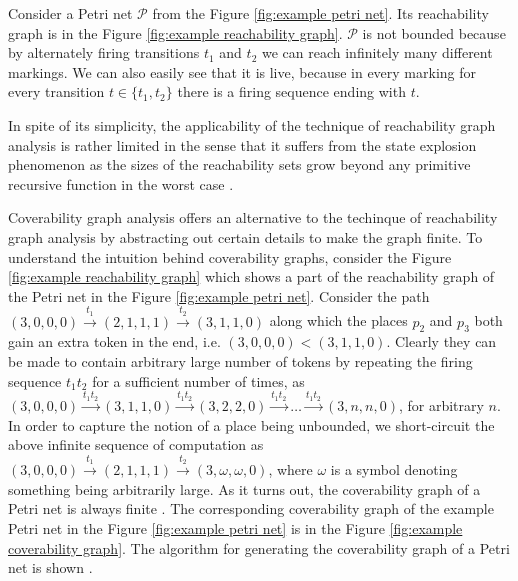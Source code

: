 \begin{example}
  Consider a Petri net $\mathcal P$ from the Figure \ref{fig:example petri net}. Its reachability graph is in the Figure \ref{fig:example reachability graph}. $\mathcal P$ is not bounded because by alternately firing transitions $t_1$ and $t_2$ we can reach infinitely many different markings. We can also easily see that it is live, because in every marking for every transition $t\in\{t_1, t_2\}$ there is a firing sequence ending with $t$.
\end{example}

In spite of its simplicity, the applicability of the technique of reachability graph analysis is rather limited in the sense that it suffers from the state explosion phenomenon as the sizes of the reachability sets grow beyond any primitive recursive function in the worst case \cite{Yen06PetriNets}.

 Coverability graph analysis offers an alternative to the techinque of reachability graph analysis by abstracting out certain details to make the graph finite. To understand the intuition behind coverability graphs, consider the Figure \ref{fig:example reachability graph} which shows a part of the reachability graph of the Petri net in the Figure \ref{fig:example petri net}. Consider the path $(3,0,0,0)\xrightarrow{t_1}(2,1,1,1)\xrightarrow{t_2}(3,1,1,0)$ along which the places $p_2$ and $p_3$ both gain an extra token in the end, i.e. $(3,0,0,0) < (3,1,1,0)$. Clearly they can be made to contain arbitrary large number of tokens by repeating the firing sequence $t_1t_2$ for a sufficient number of times, as $(3,0,0,0)\xrightarrow{t_1t_2}(3,1,1,0)\xrightarrow{t_1t_2}(3,2,2,0)\xrightarrow{t_1t_2}\ldots\xrightarrow{t_1t_2}(3,n,n,0)$, for arbitrary $n$. In order to capture the notion of a place being unbounded, we short-circuit the above infinite sequence of computation as $(3,0,0,0)\xrightarrow{t_1}(2,1,1,1)\xrightarrow{t_2}(3,\omega,\omega,0)$, where $\omega$ is a symbol denoting something being arbitrarily large. As it turns out, the coverability graph of a Petri net is always finite \cite{Karp69ParallelProgramSchemata}. The corresponding coverability graph of the example Petri net in the Figure \ref{fig:example petri net} is in the Figure \ref{fig:example coverability graph}. The algorithm for generating the coverability graph of a Petri net \cite{Yen06PetriNets} is shown .


